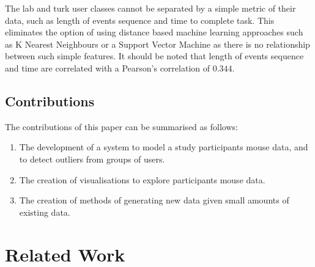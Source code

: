 \documentclass{article}
\begin{document}
The lab and turk user classes cannot be separated by a simple metric of their data, such as length of events sequence and time to complete task.
This eliminates the option of using distance based machine learning approaches such as K Nearest Neighbours or a Support Vector Machine as there is no relationship between such simple features.
It should be noted that length of events sequence and time are correlated with a Pearson's correlation of $0.344$.


\subsection{Contributions}



The contributions of this paper can be summarised as follows:

\begin{enumerate}
    \item The development of a system to model a study participants mouse data, and to detect outliers from groups of users.
    \item The creation of visualisations to explore participants mouse data.
    \item The creation of methods of generating new data given small amounts of existing data.
  \end{enumerate}

\section{Related Work}
\end{document}
